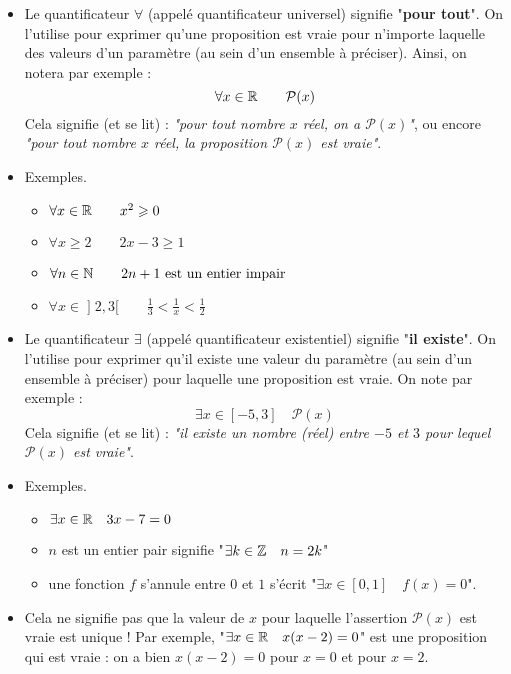 \documentclass[11pt,class=report,crop=false]{standalone}
\begin{document}
\begin{itemize}
    \item Le quantificateur \boldmath $\forall$ \unboldmath (appelé quantificateur universel) signifie "\textbf{pour tout}". On l'utilise pour exprimer qu'une proposition est vraie pour n'importe laquelle des valeurs d'un paramètre (au sein d'un ensemble à préciser). Ainsi, on notera par exemple : 
    $$ \forall x \in \mathbb{R} \qquad \mathcal{P}(x) $$
    Cela signifie (et se lit) : \emph{"pour tout nombre $x$ réel, on a $\mathcal{P}(x)$"}, ou encore \emph{"pour tout nombre $x$ réel, la proposition $\mathcal{P}(x)$ est vraie"}.

    \item Exemples. 
    \begin{itemize}
        \item $\forall x \in \mathbb{R} \qquad x^2 \geqslant0$
        \item $\forall x\ge2 \qquad 2x-3 \ge 1$
        \item $\forall n \in \mathbb{N}  \qquad 2n+1 \text{ est un entier impair}$
        \item $\forall x \in \mathopen]2,3[ \qquad \frac13 < \frac1x < \frac12$
    \end{itemize} 

    \item Le quantificateur \boldmath $\exists$ \unboldmath (appelé quantificateur existentiel) signifie "\textbf{il existe}". On l'utilise pour exprimer qu'il existe une valeur du paramètre (au sein d'un ensemble à préciser) pour laquelle une proposition est vraie. On note par exemple :
    $$ \exists x \in [-5, 3]  \quad \mathcal{P}(x) $$
    Cela signifie (et se lit) : \emph{"il existe un nombre (réel) entre $-5$ et $3$ pour lequel $\mathcal{P}(x)$ est vraie"}.

    \item Exemples. 
    \begin{itemize}
        \item $\exists x \in \mathbb{R} \quad 3x-7 = 0$
        \item $n$ est un entier pair signifie "$\exists k\in\mathbb{Z} \quad n=2k$"
        \item une fonction $f$ s'annule entre $0$ et $1$ s'écrit
        "$\exists x \in [0,1] \quad f(x)=0$".
    \end{itemize} 

    \item Cela ne signifie pas que la valeur de $x$ pour laquelle l'assertion $\mathcal{P}(x)$ est vraie est unique ! Par exemple, "$\exists x \in \mathbb{R} \quad x(x-2)=0$" est une proposition qui est vraie : on a bien $x(x-2)=0$ pour $x=0$ et pour $x=2$.
\end{itemize}
\end{document}
